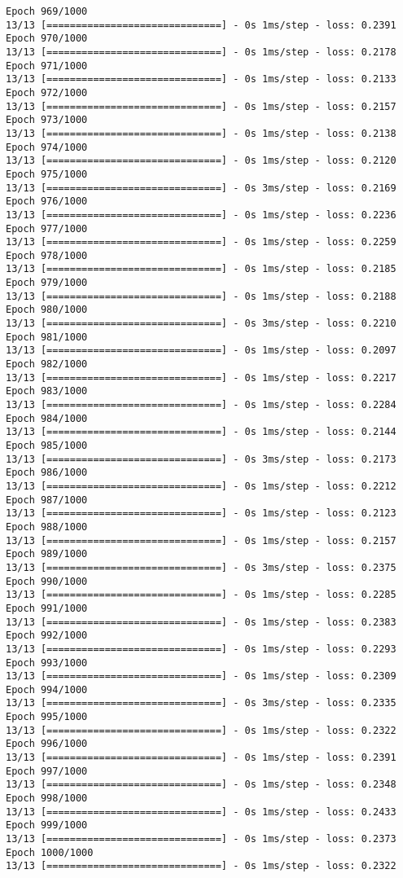 \documentclass[11pt]{article}
\begin{document}
\begin{Verbatim}[commandchars=\\\{\}]
Epoch 969/1000
13/13 [==============================] - 0s 1ms/step - loss: 0.2391
Epoch 970/1000
13/13 [==============================] - 0s 1ms/step - loss: 0.2178
Epoch 971/1000
13/13 [==============================] - 0s 1ms/step - loss: 0.2133
Epoch 972/1000
13/13 [==============================] - 0s 1ms/step - loss: 0.2157
Epoch 973/1000
13/13 [==============================] - 0s 1ms/step - loss: 0.2138
Epoch 974/1000
13/13 [==============================] - 0s 1ms/step - loss: 0.2120
Epoch 975/1000
13/13 [==============================] - 0s 3ms/step - loss: 0.2169
Epoch 976/1000
13/13 [==============================] - 0s 1ms/step - loss: 0.2236
Epoch 977/1000
13/13 [==============================] - 0s 1ms/step - loss: 0.2259
Epoch 978/1000
13/13 [==============================] - 0s 1ms/step - loss: 0.2185
Epoch 979/1000
13/13 [==============================] - 0s 1ms/step - loss: 0.2188
Epoch 980/1000
13/13 [==============================] - 0s 3ms/step - loss: 0.2210
Epoch 981/1000
13/13 [==============================] - 0s 1ms/step - loss: 0.2097
Epoch 982/1000
13/13 [==============================] - 0s 1ms/step - loss: 0.2217
Epoch 983/1000
13/13 [==============================] - 0s 1ms/step - loss: 0.2284
Epoch 984/1000
13/13 [==============================] - 0s 1ms/step - loss: 0.2144
Epoch 985/1000
13/13 [==============================] - 0s 3ms/step - loss: 0.2173
Epoch 986/1000
13/13 [==============================] - 0s 1ms/step - loss: 0.2212
Epoch 987/1000
13/13 [==============================] - 0s 1ms/step - loss: 0.2123
Epoch 988/1000
13/13 [==============================] - 0s 1ms/step - loss: 0.2157
Epoch 989/1000
13/13 [==============================] - 0s 3ms/step - loss: 0.2375
Epoch 990/1000
13/13 [==============================] - 0s 1ms/step - loss: 0.2285
Epoch 991/1000
13/13 [==============================] - 0s 1ms/step - loss: 0.2383
Epoch 992/1000
13/13 [==============================] - 0s 1ms/step - loss: 0.2293
Epoch 993/1000
13/13 [==============================] - 0s 1ms/step - loss: 0.2309
Epoch 994/1000
13/13 [==============================] - 0s 3ms/step - loss: 0.2335
Epoch 995/1000
13/13 [==============================] - 0s 1ms/step - loss: 0.2322
Epoch 996/1000
13/13 [==============================] - 0s 1ms/step - loss: 0.2391
Epoch 997/1000
13/13 [==============================] - 0s 1ms/step - loss: 0.2348
Epoch 998/1000
13/13 [==============================] - 0s 1ms/step - loss: 0.2433
Epoch 999/1000
13/13 [==============================] - 0s 1ms/step - loss: 0.2373
Epoch 1000/1000
13/13 [==============================] - 0s 1ms/step - loss: 0.2322

\end{Verbatim}
\end{document}
